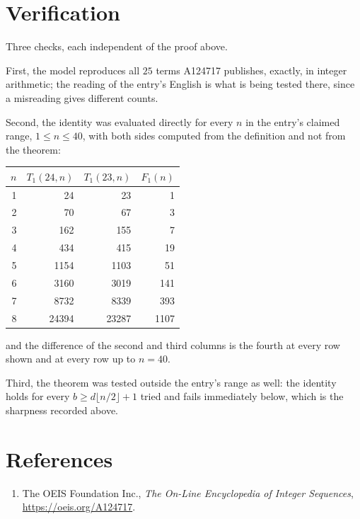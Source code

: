 \documentclass[11pt,a4paper]{article}
\theoremstyle{plain}
\theoremstyle{definition}
\begin{document}
\section{Verification}

Three checks, each independent of the proof above.

First, the model reproduces all $25$ terms A124717 publishes, exactly, in integer
arithmetic; the reading of the entry's English is what is being tested there, since a
misreading gives different counts.

Second, the identity was evaluated directly for every $n$ in the entry's claimed range,
$1\le n\le40$, with both sides computed from the definition and not from the theorem:

\begin{center}
\begin{tabular}{rrrr}
$n$ & $T_{1}(24,n)$ & $T_{1}(23,n)$ & $F_{1}(n)$ \\ \hline
1 & 24 & 23 & 1 \\
2 & 70 & 67 & 3 \\
3 & 162 & 155 & 7 \\
4 & 434 & 415 & 19 \\
5 & 1154 & 1103 & 51 \\
6 & 3160 & 3019 & 141 \\
7 & 8732 & 8339 & 393 \\
8 & 24394 & 23287 & 1107 \\
\end{tabular}
\end{center}

\noindent and the difference of the second and third columns is the fourth at every row shown
and at every row up to $n=40$.

Third, the theorem was tested outside the entry's range as well: the identity holds for every
$b\ge d\lfloor n/2\rfloor+1$ tried and fails immediately below, which is the sharpness recorded
above.

\section*{References}
\begin{enumerate}
\item The OEIS Foundation Inc., \emph{The On-Line Encyclopedia of Integer Sequences},
\url{https://oeis.org/A124717}.
\end{enumerate}
\end{document}
